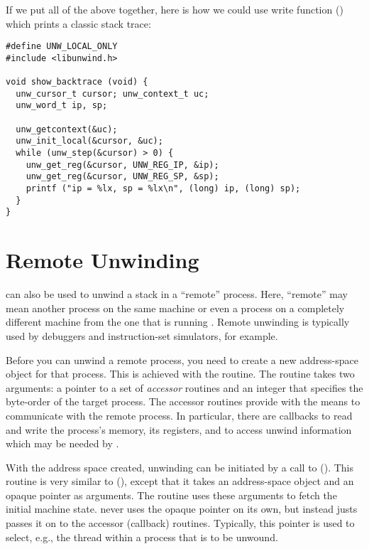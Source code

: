 \documentclass{article}
\begin{document}
If we put all of the above together, here is how we could use
 write function () which prints
a classic stack trace:

\begin{verbatim}
#define UNW_LOCAL_ONLY
#include <libunwind.h>

void show_backtrace (void) {
  unw_cursor_t cursor; unw_context_t uc;
  unw_word_t ip, sp;

  unw_getcontext(&uc);
  unw_init_local(&cursor, &uc);
  while (unw_step(&cursor) > 0) {
    unw_get_reg(&cursor, UNW_REG_IP, &ip);
    unw_get_reg(&cursor, UNW_REG_SP, &sp);
    printf ("ip = %lx, sp = %lx\n", (long) ip, (long) sp);
  }
}
\end{verbatim}


\section{Remote Unwinding}

 can also be used to unwind a stack in a ``remote''
process.  Here, ``remote'' may mean another process on the same
machine or even a process on a completely different machine from the
one that is running .  Remote unwinding is typically
used by debuggers and instruction-set simulators, for example.

Before you can unwind a remote process, you need to create a new
address-space object for that process.  This is achieved with the
 routine.  The routine takes two
arguments: a pointer to a set of \emph{accessor} routines and an
integer that specifies the byte-order of the target process.  The
accessor routines provide  with the means to
communicate with the remote process.  In particular, there are
callbacks to read and write the process's memory, its registers, and
to access unwind information which may be needed by .

With the address space created, unwinding can be initiated by a call
to ().  This routine is very similar to
(), except that it takes an address-space
object and an opaque pointer as arguments.  The routine uses these
arguments to fetch the initial machine state.   never
uses the opaque pointer on its own, but instead justs passes it on to
the accessor (callback) routines.  Typically, this pointer is used to
select, e.g., the thread within a process that is to be unwound.
\end{document}
